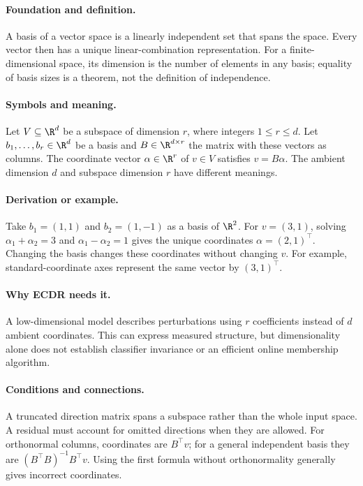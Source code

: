 \paragraph{Foundation and definition.}
A basis of a vector space is a linearly independent set that spans the
space. Every vector then has a unique linear-combination representation.
For a finite-dimensional space, its dimension is the number of elements
in any basis; equality of basis sizes is a theorem, not the definition
of independence.
\paragraph{Symbols and meaning.}
Let $V\subseteq\R^d$ be a subspace of dimension $r$, where integers
$1\le r\le d$. Let $b_1,\ldots,b_r\in\R^d$ be a basis and
$B\in\R^{d\times r}$ the matrix with these vectors as columns.
The coordinate vector $\alpha\in\R^r$ of $v\in V$ satisfies
$v=B\alpha$. The ambient dimension $d$ and subspace dimension $r$ have
different meanings.
\paragraph{Derivation or example.}
Take $b_1=(1,1)$ and $b_2=(1,-1)$ as a basis of $\R^2$.
For $v=(3,1)$, solving
$\alpha_1+\alpha_2=3$ and $\alpha_1-\alpha_2=1$ gives the unique
coordinates $\alpha=(2,1)^\top$. Changing the basis changes these
coordinates without changing $v$. For example, standard-coordinate
axes represent the same vector by $(3,1)^\top$.
\paragraph{Why ECDR needs it.}
A low-dimensional model describes perturbations using $r$ coefficients
instead of $d$ ambient coordinates. This can express measured structure,
but dimensionality alone does not establish classifier invariance or
an efficient online membership algorithm.
\paragraph{Conditions and connections.}
A truncated direction matrix spans a subspace rather than the whole
input space. A residual must account for omitted directions when they
are allowed. For orthonormal columns, coordinates are $B^\top v$;
for a general independent basis they are
$(B^\top B)^{-1}B^\top v$. Using the first formula without
orthonormality generally gives incorrect coordinates.

